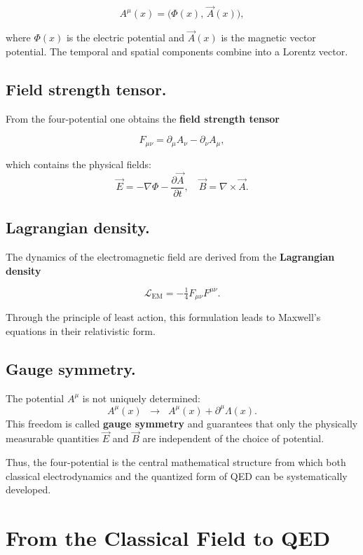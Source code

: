 \[
A^\mu(x) = \big( \Phi(x), \, \vec{A}(x) \big) ,
\]

where \( \Phi(x) \) is the electric potential and \( \vec{A}(x) \) is the magnetic vector potential. 
The temporal and spatial components combine into a Lorentz vector.

\subsection*{Field strength tensor.}
From the four-potential one obtains the \textbf{field strength tensor}

\[
F_{\mu\nu} = \partial_\mu A_\nu - \partial_\nu A_\mu ,
\]

which contains the physical fields:
\[
\vec{E} = -\nabla \Phi - \frac{\partial \vec{A}}{\partial t}, 
\quad
\vec{B} = \nabla \times \vec{A}.
\]

\subsection*{Lagrangian density.}
The dynamics of the electromagnetic field are derived from the
\textbf{Lagrangian density}

\[
\mathcal{L}_{\text{EM}} = - \tfrac{1}{4} F_{\mu\nu} F^{\mu\nu} .
\]

Through the principle of least action, this formulation leads to 
Maxwell’s equations in their relativistic form.

\subsection*{Gauge symmetry.}
The potential \( A^\mu \) is not uniquely determined:
\[
A^\mu(x) \;\;\rightarrow\;\; A^\mu(x) + \partial^\mu \Lambda(x).
\]
This freedom is called \textbf{gauge symmetry} and guarantees that only
the physically measurable quantities \( \vec{E} \) and \( \vec{B} \)
are independent of the choice of potential.

\medskip
Thus, the four-potential is the central mathematical structure from which
both classical electrodynamics and the quantized form of QED
can be systematically developed.

\section{From the Classical Field to QED}
\label{anhangA:feld_zu_qed}

